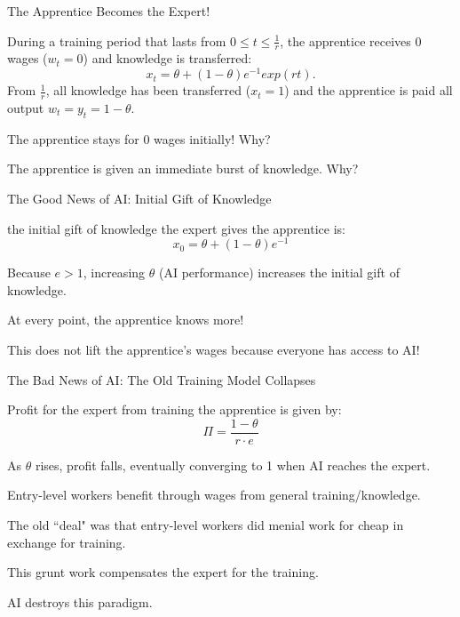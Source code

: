 \documentclass[aspectratio=169,usenames,dvipsnames]{beamer}
\newenvironment{wideitemize}{\itemize\addtolength{\itemsep}{10pt}}{\enditemize}
\begin{document}
\begin{frame}{The Apprentice Becomes the Expert!}

\begin{theorem}
    During a training period that lasts from $0\leq t \leq \frac{1}{r}$, the apprentice receives 0 wages ($w_t=0$) and knowledge is transferred:
    \[x_t = \theta + (1-\theta)e^{-1} exp(rt).\]
    From $\frac{1}{r}$, all knowledge has been transferred ($x_t=1$) and the apprentice is paid all output $w_t=y_t=1-\theta$.
\end{theorem}
    \begin{wideitemize}
        \item The apprentice stays for 0 wages initially! Why?
        \item The apprentice is given an immediate burst of knowledge. Why?
    \end{wideitemize}
\end{frame}


\begin{frame}{The Good News of AI: Initial Gift of Knowledge}

\begin{wideitemize}
    \item the initial gift of knowledge the expert gives the apprentice is:
    \[x_0 = \theta + (1-\theta) e^{-1}\]
    \item Because $e>1$, increasing $\theta$ (AI performance) increases the initial gift of knowledge.
    \item At every point, the apprentice knows more!
    \item This does not lift the apprentice's wages because everyone has access to AI! 
\end{wideitemize}

    
\end{frame}
\begin{frame}{The Bad News of AI: The Old Training Model Collapses}

\begin{wideitemize}
    \item Profit for the expert from training the apprentice is given by:
    \[\Pi = \frac{1-\theta}{r \cdot e}\]
    \item As $\theta$ rises, profit falls, eventually converging to 1 when AI reaches the expert.
    \item Entry-level workers benefit through wages from general training/knowledge.
    \item The old ``deal" was that entry-level workers did menial work for cheap in exchange for training.
    \item This grunt work compensates the expert for the training.
    \item AI destroys this paradigm.
    
\end{wideitemize}
\end{frame}
\end{document}
